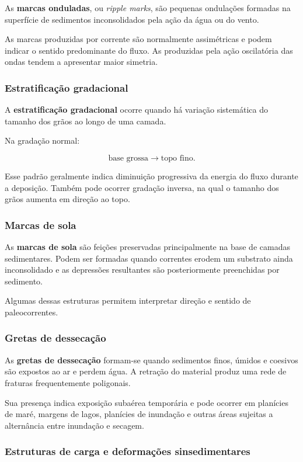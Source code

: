 \documentclass[a4paper,12pt]{article}
\theoremstyle{definition}
\theoremstyle{definition}
\theoremstyle{definition}
\begin{document}
As \textbf{marcas onduladas}, ou \textit{ripple marks}, são pequenas ondulações
formadas na superfície de sedimentos inconsolidados pela ação da água ou do
vento.

As marcas produzidas por corrente são normalmente assimétricas e podem indicar o
sentido predominante do fluxo. As produzidas pela ação oscilatória das ondas
tendem a apresentar maior simetria.

\subsubsection{Estratificação gradacional}

A \textbf{estratificação gradacional} ocorre quando há variação sistemática do
tamanho dos grãos ao longo de uma camada.

Na gradação normal:

\[
\text{base grossa}
\rightarrow
\text{topo fino}.
\]

Esse padrão geralmente indica diminuição progressiva da energia do fluxo durante
a deposição. Também pode ocorrer gradação inversa, na qual o tamanho dos grãos
aumenta em direção ao topo.

\subsubsection{Marcas de sola}

As \textbf{marcas de sola} são feições preservadas principalmente na base de
camadas sedimentares. Podem ser formadas quando correntes erodem um substrato
ainda inconsolidado e as depressões resultantes são posteriormente preenchidas
por sedimento.

Algumas dessas estruturas permitem interpretar direção e sentido de
paleocorrentes.

\subsubsection{Gretas de dessecação}

As \textbf{gretas de dessecação} formam-se quando sedimentos finos, úmidos e
coesivos são expostos ao ar e perdem água. A retração do material produz uma rede
de fraturas frequentemente poligonais.

Sua presença indica exposição subaérea temporária e pode ocorrer em planícies de
maré, margens de lagos, planícies de inundação e outras áreas sujeitas a
alternância entre inundação e secagem.

\subsubsection{Estruturas de carga e deformações sinsedimentares}
\end{document}
